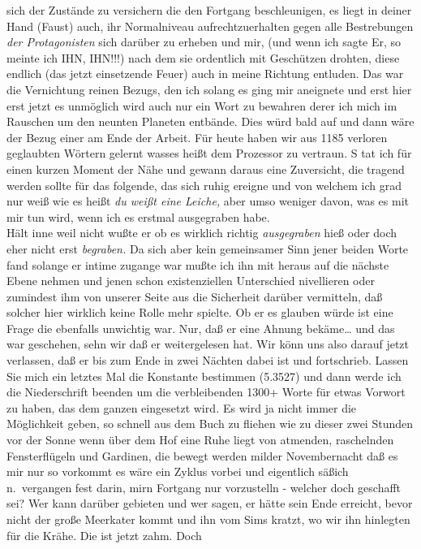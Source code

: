 \documentclass[
]{article}
\begin{document}
sich der Zustände zu versichern die den Fortgang beschleunigen, es liegt
in deiner Hand (Faust) auch, ihr Normalniveau aufrechtzuerhalten gegen
alle Bestrebungen \emph{der Protagonisten} sich darüber zu erheben und
mir, (und wenn ich sagte Er, so meinte ich IHN, IHN!!!) nach dem sie
ordentlich mit Geschützen drohten, diese endlich (das jetzt einsetzende
Feuer) auch in meine Richtung entluden. Das war die Vernichtung reinen
Bezugs, den ich solang es ging mir aneignete und erst hier erst jetzt es
unmöglich wird auch nur ein Wort zu bewahren derer ich mich im Rauschen
um den neunten Planeten entbände. Dies würd bald auf und dann wäre der
Bezug einer am Ende der Arbeit. Für heute haben wir aus 1185 verloren
geglaubten Wörtern gelernt wasses heißt dem Prozessor zu vertraun. S tat
ich für einen kurzen Moment der Nähe und gewann daraus eine Zuversicht,
die tragend werden sollte für das folgende, das sich ruhig ereigne und
von welchem ich grad nur weiß wie es heißt \emph{du weißt eine Leiche,
}aber umso weniger davon, was es mit mir tun wird, wenn ich es erstmal
ausgegraben habe.\\
Hält inne weil nicht wußte er ob es wirklich richtig \emph{ausgegraben}
hieß oder doch eher nicht erst \emph{begraben.} Da sich aber kein
gemeinsamer Sinn jener beiden Worte fand solange er intime zugange war
mußte ich ihn mit heraus auf die nächste Ebene nehmen und jenen schon
existenziellen Unterschied nivellieren oder zumindest ihm von unserer
Seite aus die Sicherheit darüber vermitteln, daß solcher hier wirklich
keine Rolle mehr spielte. Ob er es glauben würde ist eine Frage die
ebenfalls unwichtig war. Nur, daß er eine Ahnung bekäme\ldots{} und das
war geschehen, sehn wir daß er weitergelesen hat. Wir könn uns also
darauf jetzt verlassen, daß er bis zum Ende in zwei Nächten dabei ist
und fortschrieb. Lassen Sie mich ein letztes Mal die Konstante bestimmen
(5.3527) und dann werde ich die Niederschrift beenden um die
verbleibenden 1300+ Worte für etwas Vorwort zu haben, das dem ganzen
eingesetzt wird\emph{.} Es wird ja nicht immer die Möglichkeit geben, so
schnell aus dem Buch zu fliehen wie zu dieser zwei Stunden vor der Sonne
wenn über dem Hof eine Ruhe liegt von atmenden, raschelnden
Fensterflügeln und Gardinen, die bewegt werden milder Novembernacht daß
es mir nur so vorkommt es wäre ein Zyklus vorbei und eigentlich säßich
n.~vergangen fest darin, mirn Fortgang nur vorzustelln - welcher doch
geschafft sei? Wer kann darüber gebieten und wer sagen, er hätte sein
Ende erreicht, bevor nicht der große Meerkater kommt und ihn vom Sims
kratzt, wo wir ihn hinlegten für die Krähe. Die ist jetzt zahm. Doch
\end{document}

